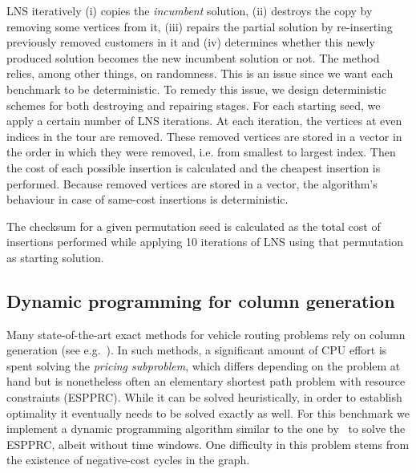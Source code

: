 \documentclass[11pt,a4paper,notitlepage]{article}
\begin{document}
LNS iteratively (i) copies the \emph{incumbent} solution, (ii)
destroys the copy by removing some vertices from it, (iii) repairs the
partial solution by re-inserting previously removed customers in it
and (iv) determines whether this newly produced solution becomes the
new incumbent solution or not. The method relies, among other
things, on randomness. This is an issue since we want each benchmark
to be deterministic. To remedy this issue, we design deterministic
schemes for both destroying and repairing stages. For each starting
seed, we apply a certain number of LNS iterations. At each iteration,
the vertices at even indices in the tour are removed. These removed
vertices are stored in a vector in the order in which they were
removed, i.e. from smallest to largest index. Then the cost of each
possible insertion is calculated and the cheapest insertion is
performed. Because removed vertices are stored in a vector, the
algorithm's behaviour in case of same-cost insertions is
deterministic. 

The checksum for a given permutation seed is calculated as the total
cost of insertions performed while applying 10 iterations of LNS using
that permutation as starting solution.

\subsection{Dynamic programming for column generation}
\label{sec:espprc}
Many state-of-the-art exact methods for vehicle routing problems rely
on column generation (see e.g.~\cite{Baldacci:2012survey}). In such
methods, a significant amount of CPU effort is spent solving the
\emph{pricing subproblem}, which differs depending on the problem at
hand but is nonetheless often an elementary shortest path problem with
resource constraints (ESPPRC). While it can be solved heuristically,
in order to establish optimality it eventually needs to be solved
exactly as well. For this benchmark we implement a dynamic
programming algorithm similar to the one by~\cite{feillet:2004exact}
to solve the ESPPRC, albeit without time windows. One difficulty in
this problem stems from the existence of negative-cost cycles in the
graph. 
\end{document}
